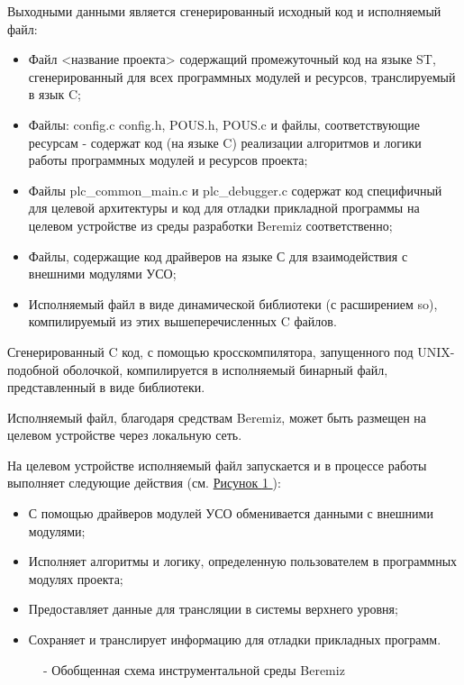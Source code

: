 \documentclass[letterpaper,10pt,russian]{sphinxmanual}
\begin{document}
Выходными данными является сгенерированный исходный код и исполняемый
файл:
\begin{itemize}
\item {} 
Файл \textless{}название проекта\textgreater{} содержащий промежуточный код на языке ST,
сгенерированный для всех программных модулей и ресурсов,
транслируемый в язык C;

\item {} 
Файлы: config.c config.h, POUS.h, POUS.c и файлы, соответствующие
ресурсам - содержат код (на языке C) реализации алгоритмов и логики
работы программных модулей и ресурсов проекта;

\item {} 
Файлы plc\_common\_main.c и plc\_debugger.c содержат код специфичный для
целевой архитектуры и код для отладки прикладной программы на целевом
устройстве из среды разработки Beremiz соответственно;

\item {} 
Файлы, содержащие код драйверов на языке С для взаимодействия с
внешними модулями УСО;

\item {} 
Исполняемый файл в виде динамической библиотеки (с расширением so),
компилируемый из этих вышеперечисленных C файлов.

\end{itemize}

Сгенерированный C код, с помощью кросскомпилятора, запущенного под
UNIX-подобной оболочкой, компилируется в исполняемый бинарный файл,
представленный в виде библиотеки.

Исполняемый файл, благодаря средствам Beremiz, может быть размещен на
целевом устройстве через локальную сеть.

На целевом устройстве исполняемый файл запускается и в процессе работы
выполняет следующие действия (см. \hyperref[usage_guide/overview:image1]{Рисунок \ref{usage_guide/overview:image1} }):
\begin{itemize}
\item {} 
С помощью драйверов модулей УСО обменивается данными с внешними
модулями;

\item {} 
Исполняет алгоритмы и логику, определенную пользователем в
программных модулях проекта;

\item {} 
Предоставляет данные для трансляции в системы верхнего уровня;

\item {} 
Сохраняет и транслирует информацию для отладки прикладных программ.

\end{itemize}
\begin{figure}[htbp]
\centering
\capstart

\noindent{}
\caption{- Обобщенная схема инструментальной среды Beremiz}\label{usage_guide/overview:image1}\end{figure}
\end{document}
